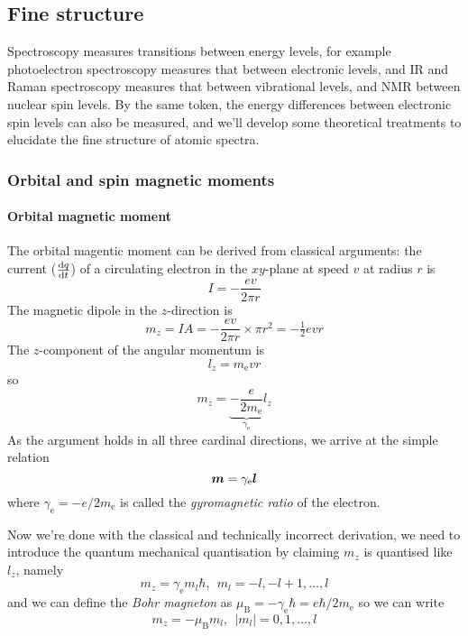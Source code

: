 \subsection{Fine structure}
Spectroscopy measures transitions between energy levels, for example photoelectron spectroscopy measures that between electronic levels, and IR and Raman spectroscopy measures that between vibrational levels, and NMR between nuclear spin levels. By the same token, the energy differences between electronic spin levels can also be measured, and we'll develop some theoretical treatments to elucidate the fine structure of atomic spectra.
\subsubsection{Orbital and spin magnetic moments}
\paragraph{Orbital magnetic moment}
The orbital magentic moment can be derived from classical arguments: the current ($\diff qt$) of a circulating electron in the $xy$-plane at speed $v$ at radius $r$ is
\begin{equation}
 	I=-\frac{ev}{2\pi r}
\end{equation} 
The magnetic dipole in the $z$-direction is
\begin{equation}
	m_z=IA=-\frac{ev}{2\pi r}\times\pi r^2=-\tfrac{1}{2}evr
\end{equation}
The $z$-component of the angular momentum is 
\begin{equation}
	l_z=m_{\mathrm{e}}vr
\end{equation}
so
\begin{equation}
	m_z=\underbrace{-\frac{e}{2m_{\mathrm{e}}}}_{\gamma_{\mathrm{e}}} l_z
\end{equation}
As the argument holds in all three cardinal directions, we arrive at the simple relation
\begin{equation}
	\boldsymbol{m}=\gamma_{\mathrm{e}}\boldsymbol{l}
\end{equation}
where $\gamma_{\mathrm{e}}=-e/2m_{\mathrm{e}}$ is called the \emph{gyromagnetic ratio} of the electron.\par
Now we're done with the classical and technically incorrect derivation, we need to introduce the quantum mechanical quantisation by claiming $m_z$ is quantised like $l_z$, namely
\begin{equation}
	m_z=\gamma_{\mathrm{e}}m_l\hbar,\ \ m_l=-l,-l+1,\dots,l
\end{equation}
and we can define the \emph{Bohr magneton} as $\mu_{\mathrm{B}}=-\gamma_{\mathrm{e}}\hbar=e\hbar/2m_{\mathrm{e}}$ so we can write
\begin{equation}
	m_z=-\mu_{\mathrm{B}}m_l,\ \ |m_l|=0,1,\dots,l
\end{equation}
